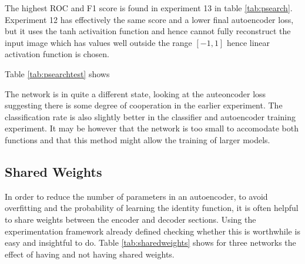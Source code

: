       The highest ROC and F1 score is found in experiment 13 in table \ref{tab:psearch}. Experiment 12
      has effectively the same score and a lower final autoencoder loss, but it uses the tanh activaition
      function and hence cannot fully reconstruct the input image which has values well outside the
      range $[-1,1]$ hence linear activation function is chosen.


      Table \ref{tab:psearchtest} shows

      The network is in quite a different state, looking at the auteoncoder loss
      suggesting there is some degree of cooperation in the earlier experiment.
      The classification rate is also slightly better in the classifier and autoencoder
      training experiment. It may be however that the network is too small to accomodate both
      functions and that this method might allow the training of larger models.
      \newpage
    \subsection{Shared Weights}
      In order to reduce the number of parameters in an autoencoder, to avoid overfitting
      and the probability of learning the identity function, it is often helpful to share weights
      between the encoder and decoder sections. Using the experimentation framework already defined
      checking whether this is worthwhile is easy and insightful to do. Table \ref{tab:sharedweights} shows
      for three networks the effect of having and not having shared weights.

